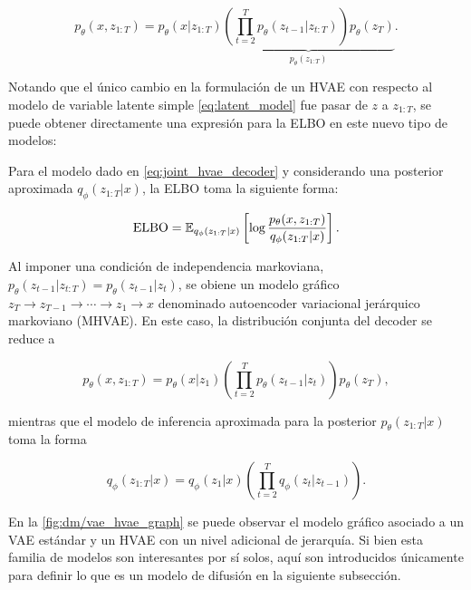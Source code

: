 \begin{equation}
    \label{eq:joint_hvae_decoder}
    p_\theta(x, z_{1:T})
    = p_\theta(x|z_{1:T})\underbrace{
        \left(\prod_{t=2}^{T} p_\theta(z_{t-1}|z_{t:T})\right)
        p_\theta(z_T)}_{p_\theta(z_{1:T})}.
\end{equation}

Notando que el único cambio en la formulación de un HVAE con respecto al modelo de variable latente simple \eqref{eq:latent_model} fue pasar de $z$ a $z_{1:T}$, se puede obtener directamente una expresión para la ELBO en este nuevo tipo de modelos:

\begin{prop}
    Para el modelo dado en \eqref{eq:joint_hvae_decoder} y considerando una posterior aproximada $q_\phi(z_{1:T}|x)$, la ELBO toma la siguiente forma:

    \begin{equation}
        \label{eq:elbo_mhvae}
        \operatorname{ELBO}
        = \mathbb{E}_{q_\phi(z_{1:T}|x)}\left[\log\frac{p_\theta(x,z_{1:T})}{q_\phi(z_{1:T}|x)}\right].
    \end{equation}
\end{prop}

Al imponer una condición de independencia markoviana, $p_\theta(z_{t-1}|z_{t:T})=p_\theta(z_{t-1}|z_t)$, se obiene un modelo gráfico $z_T\to z_{T-1}\to\cdots\to z_1\to x$ denominado autoencoder variacional jerárquico markoviano (MHVAE). En este caso, la distribución conjunta del decoder se reduce a

\begin{equation*}
    p_\theta(x, z_{1:T})
    = p_\theta(x|z_1)\left(\prod_{t=2}^{T}
    p_\theta(z_{t-1}|z_t)\right)
    p_\theta(z_T),
\end{equation*}

mientras que el modelo de inferencia aproximada para la posterior $p_\theta(z_{1:T}|x)$ toma la forma

\begin{equation*}
    q_\phi(z_{1:T}|x)
    = q_\phi(z_1|x) \left(\prod_{t=2}^{T} q_\phi(z_t|z_{t-1})\right).
\end{equation*}

En la \autoref{fig:dm/vae_hvae_graph} se puede observar el modelo gráfico asociado a un VAE estándar y un HVAE con un nivel adicional de jerarquía. Si bien esta familia de modelos son interesantes por sí solos, aquí son introducidos únicamente para definir lo que es un modelo de difusión en la siguiente subsección.

